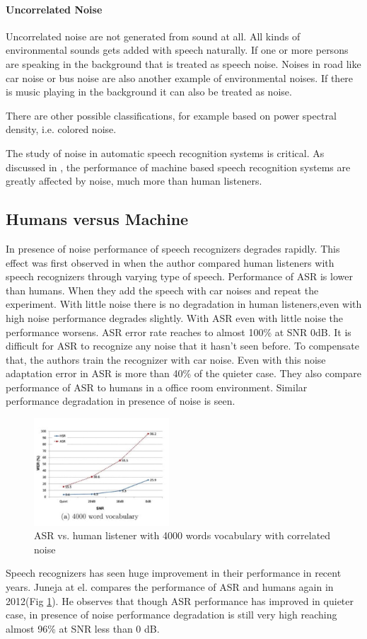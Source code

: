 \documentclass[journal,  onecolumn, 12pt]{IEEEtran}
\begin{document}
\paragraph*{Uncorrelated Noise}
Uncorrelated noise are not generated from sound at all. All kinds of environmental sounds gets added with speech naturally. If one or more persons are speaking in the background that is treated as speech noise. Noises in road like car noise or bus noise are also another example of environmental noises. If there is music playing in the background it can also be treated as noise.

There are other possible classifications, for example based on power spectral density, i.e. colored noise.

The study of noise in automatic speech recognition systems is critical. As discussed in \cite{Lippmann1997Speech}, the performance of machine based speech recognition systems are greatly affected by noise, much more than human listeners.

\subsection{Humans versus Machine}
In presence of noise performance of speech recognizers degrades rapidly. This effect was first observed in \cite{Lippmann1997Speech} when the author compared human listeners with speech recognizers through varying type of speech. Performance of ASR is lower than humans. When they add the speech with car noises and repeat the experiment. With little noise there is no degradation in human listeners,even with high noise performance degrades slightly. With ASR even with little noise the performance worsens. ASR error rate reaches to almost 100\% at SNR 0dB. It is difficult for ASR to recognize any noise that it hasn't seen before. To compensate that, the authors train the recognizer with car noise. Even with this noise adaptation error in ASR is more than 40\% of the quieter case. They also compare performance of ASR to humans in a office room environment. Similar performance degradation in presence of noise is seen. 
\begin{figure}
\centering
\includegraphics[width=0.45\textwidth]{Juneja}
\caption{ASR vs. human listener with 4000 words vocabulary with correlated noise}
\label{fig:jun}
\end{figure}
Speech recognizers has seen huge improvement in their performance in recent years. Juneja at el. \cite{Juneja2012} compares the performance of ASR and humans again in 2012(Fig \ref{fig:jun}). He observes that though ASR performance has improved in quieter case, in presence of noise performance degradation is still very high reaching almost 96\% at SNR less than 0 dB.  
\end{document}
